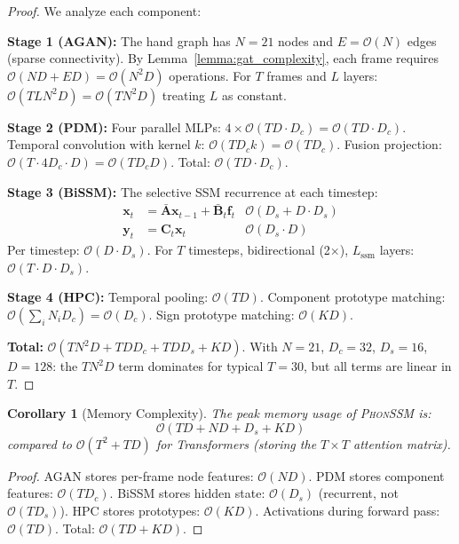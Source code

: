 \documentclass[sigconf,nonacm,anonymous]{acmart}
\newtheorem{corollary}[theorem]{Corollary}
\theoremstyle{definition}
\theoremstyle{remark}
\newcommand{\phonssm}{\textsc{PhonSSM}}
\begin{document}
\begin{proof}
We analyze each component:

\textbf{Stage 1 (AGAN):} The hand graph has $N=21$ nodes and $E = \mathcal{O}(N)$ edges (sparse connectivity). By Lemma~\ref{lemma:gat_complexity}, each frame requires $\mathcal{O}(ND + ED) = \mathcal{O}(N^2 D)$ operations. For $T$ frames and $L$ layers: $\mathcal{O}(TLN^2D) = \mathcal{O}(TN^2D)$ treating $L$ as constant.

\textbf{Stage 2 (PDM):} Four parallel MLPs: $4 \times \mathcal{O}(TD \cdot D_c) = \mathcal{O}(TD \cdot D_c)$. Temporal convolution with kernel $k$: $\mathcal{O}(T D_c k) = \mathcal{O}(TD_c)$. Fusion projection: $\mathcal{O}(T \cdot 4D_c \cdot D) = \mathcal{O}(TD_c D)$. Total: $\mathcal{O}(TD \cdot D_c)$.

\textbf{Stage 3 (BiSSM):} The selective SSM recurrence at each timestep:
\begin{align}
\mathbf{x}_t &= \bar{\mathbf{A}} \mathbf{x}_{t-1} + \bar{\mathbf{B}}_t \mathbf{f}_t & \mathcal{O}(D_s + D \cdot D_s) \\
\mathbf{y}_t &= \mathbf{C}_t \mathbf{x}_t & \mathcal{O}(D_s \cdot D)
\end{align}
Per timestep: $\mathcal{O}(D \cdot D_s)$. For $T$ timesteps, bidirectional (2$\times$), $L_{\text{ssm}}$ layers: $\mathcal{O}(T \cdot D \cdot D_s)$.

\textbf{Stage 4 (HPC):} Temporal pooling: $\mathcal{O}(TD)$. Component prototype matching: $\mathcal{O}(\sum_i N_i D_c) = \mathcal{O}(D_c)$. Sign prototype matching: $\mathcal{O}(KD)$.

\textbf{Total:} $\mathcal{O}(TN^2D + TD D_c + TD D_s + KD)$. With $N=21$, $D_c=32$, $D_s=16$, $D=128$: the $TN^2D$ term dominates for typical $T=30$, but all terms are linear in $T$.
\end{proof}

\begin{corollary}[Memory Complexity]
\label{cor:memory}
The peak memory usage of \phonssm{} is:
\begin{equation}
\mathcal{O}(TD + ND + D_s + KD)
\end{equation}
compared to $\mathcal{O}(T^2 + TD)$ for Transformers (storing the $T \times T$ attention matrix).
\end{corollary}

\begin{proof}
AGAN stores per-frame node features: $\mathcal{O}(ND)$. PDM stores component features: $\mathcal{O}(T D_c)$. BiSSM stores hidden state: $\mathcal{O}(D_s)$ (recurrent, not $\mathcal{O}(TD_s)$). HPC stores prototypes: $\mathcal{O}(KD)$. Activations during forward pass: $\mathcal{O}(TD)$. Total: $\mathcal{O}(TD + KD)$.
\end{proof}
\end{document}
